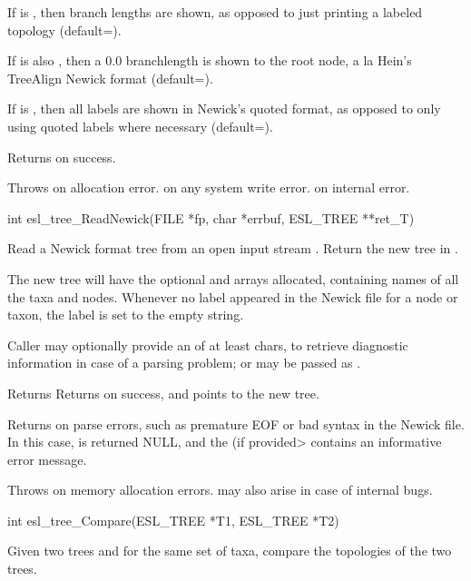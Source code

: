 \begin{sreapi}
If  is , then branch
lengths are shown, as opposed to just printing a labeled
topology (default=).

If  is also , then a
0.0 branchlength is shown to the root node, a la Hein's
TreeAlign Newick format (default=).

If  is , then all labels
are shown in Newick's quoted format, as opposed to only
using quoted labels where necessary (default=).

Returns  on success.

Throws  on allocation error.
 on any system write error.
 on internal error.



\hypertarget{func:esl_tree_ReadNewick()}
{\item[int esl\_tree\_ReadNewick(FILE *fp, char *errbuf, ESL\_TREE **ret\_T)]}

Read a Newick format tree from an open input stream .
Return the new tree in . 

The new tree  will have the optional  and
 arrays allocated, containing names of all the
taxa and nodes. Whenever no label appeared in the Newick file
for a node or taxon, the label is set to the empty string.

Caller may optionally provide an  of at least
 chars, to retrieve diagnostic information
in case of a parsing problem; or  may be passed as
.

Returns Returns  on success, and  points
to the new tree.

Returns  on parse errors, such as premature EOF
or bad syntax in the Newick file. In this case,  is
returned NULL, and the  (if provided> contains an
informative error message.

Throws  on memory allocation errors.
 may also arise in case of internal bugs.



\hypertarget{func:esl_tree_Compare()}
{\item[int esl\_tree\_Compare(ESL\_TREE *T1, ESL\_TREE *T2)]}

Given two trees  and  for the same
set of  taxa, compare the topologies of the
two trees.


\end{sreapi}
